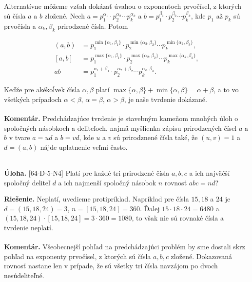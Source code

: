 \documentclass[11pt,a4paper,oneside,final]{book}
\newcommand{\kom}{\textbf{Komentár.} }
\newcommand{\ul}{\textbf{Úloha.} }
\newcommand{\rie}{\textbf{Riešenie.} }
\begin{document}
Alternatívne môžeme vzťah dokázať úvahou o exponentoch prvočísel, z ktorých sú čísla $a$ a $b$ zložené. Nech $a=p_1^{\alpha_1}\cdot p_2^{\alpha_2} \cdots p_k^{\alpha_k}$ a $b=p_1^{\beta_1}\cdot p_2^{\beta_2} \cdots p_k^{\beta_k}$, kde $p_1$ až $p_k$ sú prvočísla a $\alpha_k, \beta_k$ prirodzené čísla. Potom
\vspace{-25pt}
\begin{center}
\begin{align*}
(a,b) &=p_1^{\min\{\alpha_1, \beta_1\}}\cdot p_2^{\min\{\alpha_2, \beta_2\}}\cdots p_k^{\min\{\alpha_k, \beta_k\}},\\
[a,b] &=p_1^{\max\{\alpha_1, \beta_1\}}\cdot p_2^{\max\{\alpha_2, \beta_2\}}\cdots p_k^{\max\{\alpha_k, \beta_k\}},\\
ab &=p_1^{\alpha_1+\beta_1}\cdot p_2^{\alpha_2+\beta_2}\cdots p_k^{\alpha_k, \beta_k}.
\end{align*}
\end{center}
Keďže pre akékoĺvek čísla $\alpha, \beta$ platí $\max\{\alpha, \beta\}+\min\{\alpha, \beta\}=\alpha+\beta$, a to vo všetkých prípadoch $\alpha < \beta$, $\alpha = \beta$, $\alpha > \beta$, je naše tvrdenie dokázané.\\
\\
\kom Predchádzajúce tvrdenie je stavebným kameňom mnohých úloh o spoločných násobkoch a deliteľoch, najmä myšlienka zápisu prirodzených čísel $a$ a $b$ v tvare $a=ud$ a $b=vd$, kde $u$ a $v$ sú prirodznené čísla také, že $(u,v)=1$ a $d=(a,b)$ nájde uplatnenie veľmi často. \\
\\
\begin{tcolorbox}[breakable,notitle,boxrule=0pt,colback=light-gray,colframe=light-gray]\ul [64-D-5-N4] Platí pre každé tri prirodzené čísla $a, b, c$ a ich najväčší spoločný deliteľ $d$ a ich najmenší spoločný násobok $n$ rovnosť $abc = nd$?

\end{tcolorbox}

\rie Neplatí, uvedieme protipríklad. Napríklad pre čísla $15, 18$ a $24$ je $d=(15,18,24)=3$, $n=[15, 18, 24]=360$. Ďalej $15\cdot 18 \cdot 24 =6480$ a $(15,18,24)\cdot[15, 18, 24]=3\cdot 360=1080$, to však nie sú rovnaké čísla a tvrdenie neplatí. \\
\\
\kom Všeobecnejší pohľad na predchádzajúci problém by sme dostali skrz pohľad na exponenty prvočísel, z ktorých sú čísla $a, b, c$ zložené. Dokazovaná rovnosť nastane len v prípade, že sú všetky tri čísla navzájom po dvoch nesúdeliteľné.
\end{document}
